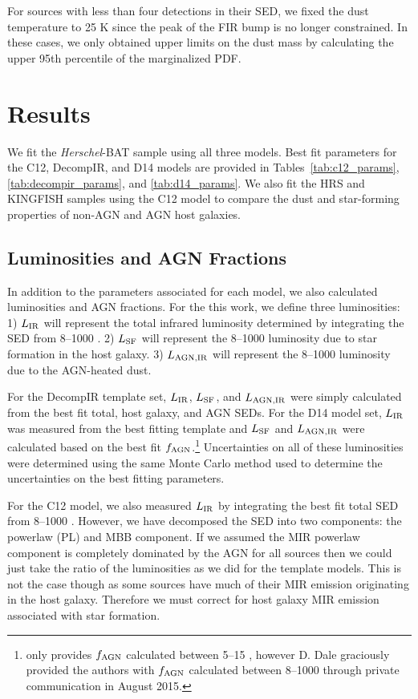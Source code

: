 \documentclass[fleqn, usenatbib]{mnras}
\newcommand{\herschel}{\emph{Herschel}}
\begin{document}
For sources with less than four detections in their SED, we fixed the dust temperature to 25 K since the peak of the FIR bump is no longer constrained. In these cases, we only obtained upper limits on the dust mass by calculating the upper 95th percentile of the marginalized PDF.

\section{Results}
We fit the \herschel-BAT sample using all three models. Best fit parameters for the C12, DecompIR, and D14 models are provided in Tables~\ref{tab:c12_params}, \ref{tab:decompir_params}, and \ref{tab:d14_params}. We also fit the HRS and KINGFISH samples using the C12 model to compare the dust and star-forming properties of non-AGN and AGN host galaxies. 

\subsection{Luminosities and AGN Fractions}
In addition to the parameters associated for each model, we also calculated luminosities and AGN fractions. For the this work, we define three luminosities: 1) $L_{\rm IR}$ will represent the total infrared luminosity determined by integrating the SED from 8--1000 \micron. 2) $L_{\rm SF}$ will represent the 8--1000 \micron{} luminosity due to star formation in the host galaxy. 3) $L_{\rm AGN, IR}$ will represent the 8--1000 \micron luminosity due to the AGN-heated dust. 

For the DecompIR template set, $L_{\rm IR}$, $L_{\rm SF}$, and $L_{\rm AGN, IR}$ were simply calculated from the best fit total, host galaxy, and AGN SEDs. For the D14 model set, $L_{\rm IR}$ was measured from the best fitting template and $L_{\rm SF}$ and $L_{\rm AGN, IR}$ were calculated based on the best fit $f_{\rm AGN}$.\footnote{\citet{Dale:2014yq} only provides $f_{\rm AGN}$ calculated between 5--15 \micron, however D. Dale graciously provided the authors with $f_{\rm AGN}$ calculated between 8--1000 \micron{} through private communication in August 2015.} Uncertainties on all of these luminosities were determined using the same Monte Carlo method used to determine the uncertainties on the best fitting parameters.

For the C12 model, we also measured $L_{\rm IR}$ by integrating the best fit total SED from 8--1000 \micron. However, we have decomposed the SED into two components: the powerlaw (PL) and MBB component. If we assumed the MIR powerlaw component is completely dominated by the AGN for all sources then we could just take the ratio of the luminosities as we did for the template models. This is not the case though as some sources have much of their MIR emission originating in the host galaxy. Therefore we must correct for host galaxy MIR emission associated with star formation.
\end{document}
